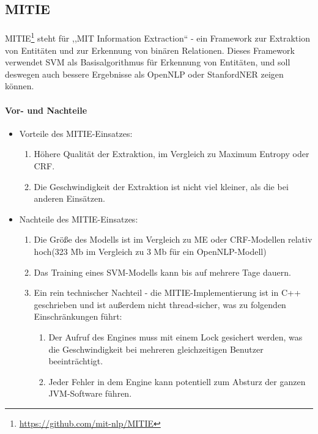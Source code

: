 \subsection{MITIE}
\paragraph{}
MITIE\footnote{\url{https://github.com/mit-nlp/MITIE}} steht für ,,MIT Information Extraction`` - ein Framework zur Extraktion von Entitäten und zur Erkennung von binären Relationen. Dieses Framework verwendet SVM als Basisalgorithmus für Erkennung von Entitäten, und soll deswegen auch bessere Ergebnisse als OpenNLP oder StanfordNER zeigen können.

\paragraph{Vor- und Nachteile}
\begin{itemize}
\item Vorteile des MITIE-Einsatzes:
\begin{enumerate}
\item Höhere Qualität der Extraktion, im Vergleich zu Maximum Entropy oder CRF.
\item Die Geschwindigkeit der Extraktion ist nicht viel kleiner, als die bei anderen Einsätzen.
\end{enumerate}
\item Nachteile des MITIE-Einsatzes:
\begin{enumerate}
\item Die Größe des Modells ist im Vergleich zu ME oder CRF-Modellen relativ hoch(323 Mb im Vergleich zu 3 Mb für ein OpenNLP-Modell)
\item Das Training eines SVM-Modells kann bis auf mehrere Tage dauern.
\item Ein rein technischer Nachteil - die MITIE-Implementierung ist in C++ geschrieben und ist außerdem nicht thread-sicher, was zu folgenden Einschränkungen führt:
\begin{enumerate}
\item Der Aufruf des Engines muss mit einem Lock gesichert werden, was die Geschwindigkeit bei mehreren gleichzeitigen Benutzer beeinträchtigt.
\item Jeder Fehler in dem Engine kann potentiell zum Absturz der ganzen JVM-Software führen.
\end{enumerate}
\end{enumerate}
\end{itemize}

